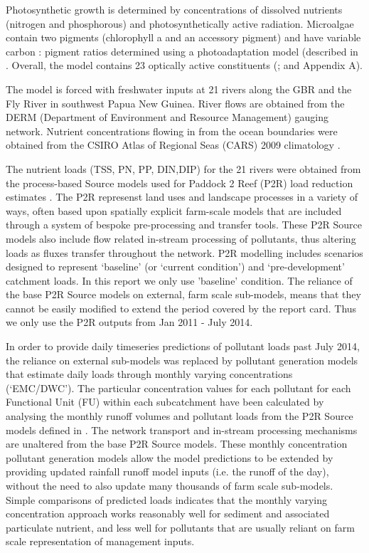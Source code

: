Photosynthetic growth is determined by concentrations of dissolved nutrients (nitrogen and
phosphorous) and photosynthetically active radiation. Microalgae contain two pigments (chlorophyll a
and an accessory pigment) and have variable carbon : pigment ratios determined using a
photoadaptation model (described in \citet{Baird13}. Overall, the model contains 23 optically active
constituents (\citet{Baird16a}; and Appendix A).

The model is forced with freshwater inputs at 21 rivers along the GBR and the Fly River in southwest
Papua New Guinea. River flows are obtained from the DERM (Department of Environment and Resource
Management) gauging network. Nutrient concentrations flowing in from the ocean boundaries were
obtained from the CSIRO Atlas of Regional Seas (CARS) 2009 climatology \citep{Ridgway02}.

The nutrient loads (TSS, PN, PP, DIN,DIP) for the 21 rivers were obtained from the process-based
Source models used for Paddock 2 Reef (P2R) load reduction estimates \citep{Waters14}. The P2R
represenst land uses and landscape processes in a variety of ways, often based upon spatially
explicit farm-scale models that are included through a system of bespoke pre-processing and transfer
tools. These P2R Source models also include flow related in-stream processing of pollutants, thus
altering loads as fluxes transfer throughout the network. P2R modelling includes scenarios designed
to represent ‘baseline’ (or ‘current condition’) and ‘pre-development’ catchment loads. In this
report we only use 'baseline' condition. The reliance of the base P2R Source models on external,
farm scale sub-models, means that they cannot be easily modified to extend the period covered by the
report card. Thus we only use the P2R outputs from Jan 2011 - July 2014.

In order to provide daily timeseries predictions of pollutant loads past July 2014, the reliance on
external sub-models was replaced by pollutant generation models that estimate daily loads through
monthly varying concentrations (‘EMC/DWC’). The particular concentration values for each pollutant
for each Functional Unit (FU) within each subcatchment have been calculated by analysing the monthly
runoff volumes and pollutant loads from the P2R Source models defined in \citet{Waters14}. The
network transport and in-stream processing mechanisms are unaltered from the base P2R Source
models. These monthly concentration pollutant generation models allow the model predictions to be
extended by providing updated rainfall runoff model inputs (i.e. the runoff of the day), without the
need to also update many thousands of farm scale sub-models. Simple comparisons of predicted loads
indicates that the monthly varying concentration approach works reasonably well for sediment and
associated particulate nutrient, and less well for pollutants that are usually reliant on farm scale
representation of management inputs.

